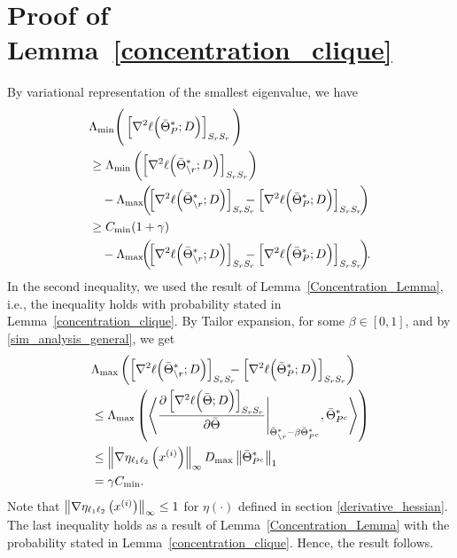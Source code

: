 \section{Proof of Lemma~\ref{concentration_clique}}
 By variational representation of the smallest eigenvalue, we have
\begin{equation}
\begin{aligned}
&\Lambda_{\min}\Bigg(\left[\nabla^2\ell\Big(\bar{\Theta}^*_P;\Data\Big)\right]_{\support_\svert\support_\svert}\Bigg)\\ &\geq\Lambda_{\min}\left(\left[\nabla^2\ell\Big(\bar{\Theta}^*_{\backslash\svert};\Data\Big)\right]_{\support_\svert\support_\svert}\right)\\ &\quad-\Lambda_{\max}\!\!\left(\!\left[\nabla^2\ell\Big(\bar{\Theta}^*_{\backslash\svert};\Data\Big)\right]_{\support_\svert\support_\svert} \!\!\!\!\!\!-\left[\nabla^2\ell\Big(\bar{\Theta}^*_P;\Data\Big)\right]_{\support_\svert\support_\svert}\!\right)\\
&\geq C_{\min}(1+\gamma)\\ &\quad-\Lambda_{\max}\!\!\left(\!\left[\nabla^2\ell\Big(\bar{\Theta}^*_{\backslash\svert};\Data\Big)\right]_{\support_\svert\support_\svert} \!\!\!\!\!\!-\left[\nabla^2\ell\Big(\bar{\Theta}^*_P;\Data\Big)\right]_{\support_\svert\support_\svert}\!\right)\!\!.
\end{aligned}
\nonumber
\end{equation}
In the second inequality, we used the result of Lemma~\ref{Concentration_Lemma}, i.e., the inequality holds with probability stated in Lemma~\ref{concentration_clique}. By Tailor expansion, for some $\beta\in[0,1]$, and by \eqref{sim_analysis_general}, we get
\begin{equation}
\begin{aligned}
&\Lambda_{\max}\left(\left[\nabla^2\ell\Big(\bar{\Theta}^*_{\backslash r};D\Big)\right]_{S_{r}S_{r}} \!\!\!\!-\left[\nabla^2\ell\Big(\bar{\Theta}^*_P;D\Big)\right]_{S_{r}S_{r}}\right)\\ &\leq\Lambda_{\max}\left(\left<\frac{\partial\left[\nabla^2\ell\Big(\bar{\Theta};D\Big)\right]_{S_{r}S_{r}}}{\partial\bar{\Theta}}\Biggr|_{\bar{\Theta}^*_{\backslash r}-\beta\bar{\Theta}^*_{P^c}},\bar{\Theta}^*_{P^c}\right>\right)\\
&\leq\left\|\nabla\eta_{\ell_1\ell_2}\left(x^{(i)}\right)\right\|_{\infty}D_{\max}\left\|\bar{\Theta}^*_{P^c}\right\|_{1}\\
&=\gamma C_{\min}. 
\end{aligned}
\nonumber
\end{equation}
Note that $\left\|\nabla\eta_{\ell_1\ell_2}\left(x^{(i)}\right)\right\|_{\infty}\leq 1$ for $\eta(\cdot)$ defined in section \ref{derivative_hessian}. The last inequality holds as a result of Lemma~\ref{Concentration_Lemma} with the probability stated in Lemma~\ref{concentration_clique}. Hence, the result follows.

